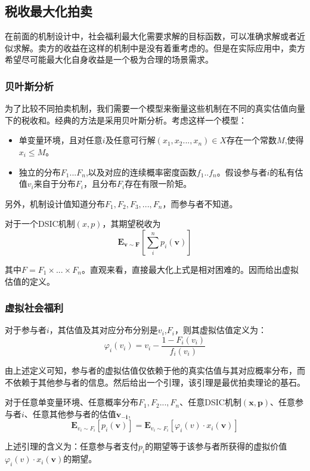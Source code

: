 \documentclass[promaster]{thesis-uestc}
\begin{document}
\subsection{税收最大化拍卖}
在前面的机制设计中，社会福利最大化需要求解的目标函数，可以准确求解或者近似求解。卖方的收益在这样的机制中是没有着重考虑的。但是在实际应用中，卖方希望尽可能最大化自身收益是一个极为合理的场景需求。
\subsubsection{贝叶斯分析}
为了比较不同拍卖机制，我们需要一个模型来衡量这些机制在不同的真实估值向量下的税收和。经典的方法是采用贝叶斯分析。考虑这样一个模型：
\begin{itemize}
    \item 单变量环境，且对任意$i$及任意可行解$(x_1,x_2...,x_n)\in X$存在一个常数$M$,使得$x_i\leq M$。
    \item 独立的分布$F_1...F_n$,以及对应的连续概率密度函数$f_1..f_n$。假设参与者$i$的私有估值$v_i$来自于分布$F_i$，且分布$F_i$存在有限一阶矩。
\end{itemize}
另外，机制设计值知道分布$F_1,F_2,F_3,...,F_n$，而参与者不知道。
\begin{definition}[期望税收]
对于一个DSIC机制$(x,p)$，其期望税收为
   \begin{equation}
    \mathbf{E}_{\mathbf{v}\sim\mathbf{F}}{\left[\sum_{i}^{n}{p_i(\mathbf{v})}\right]}
    \end{equation}
\end{definition}
其中$F=F_1\times...\times F_n$。直观来看，直接最大化上式是相对困难的。因而给出虚拟估值的定义。
\subsubsection{虚拟社会福利}
\begin{definition}[虚拟估值]
    对于参与者$i$，其估值及其对应分布分别是$v_i$,$F_i$，则其虚拟估值定义为：
    \begin{equation}
     \varphi_i(v_i) = v_i - \frac{1-F_i(v_i)}{f_i(v_i)}   
    \end{equation}
\end{definition}
由上述定义可知，参与者的虚拟估值仅依赖于他的真实估值与其对应概率分布，而不依赖于其他参与者的信息。然后给出一个引理，该引理是最优拍卖理论的基石。
\begin{lemma}
\label{virtualval}
    对于任意单变量环境、任意概率分布$F_1,F_2...,F_n$、任意DSIC机制$(\mathbf{x},\mathbf{p})$、任意参与者$i$、任意其他参与者的估值$\mathbf{v_{-i}}$,
    \begin{equation}
       \mathbf{E}_{v_i\sim F_i}[p_i(\mathbf{v})]= \mathbf{E}_{v_i\sim F_i}[\varphi_i(v)\cdot x_i(\mathbf{v})]
    \end{equation}
\end{lemma}
上述引理的含义为：任意参与者支付$p_i$的期望等于该参与者所获得的虚拟价值$\varphi_i(v)\cdot x_i(\mathbf{v})$的期望。
\end{document}
